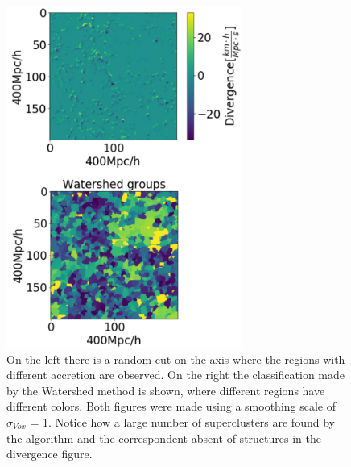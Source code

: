 \documentclass[usenatbib]{mnras}
\begin{document}
\begin{figure}
    \centering
    \includegraphics[width=220pt]{smooth_watershed_01.pdf}
    \caption{On the left there is a random cut on the axis where the regions with different accretion are observed. On the right the classification made by the Watershed method is shown, where different regions have different colors. Both figures were made using a smoothing scale of $\sigma_{Vox}$ = 1. Notice how a large number of superclusters are found by the algorithm and the correspondent absent of structures in the divergence figure.}
    \label{fig:1Pert}
\end{figure}
\end{document}
